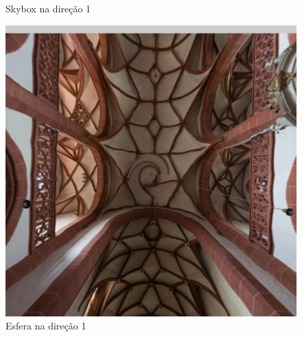 \documentclass[conference]{IEEEtran}
\begin{document}
\begin{figure}[!tbp]
\begin{minipage}[b]{0.3\textwidth}
    \caption{Skybox na direção 1}
    \label{fig:equisphere}
  \end{minipage}
  \hfill
  \begin{minipage}[b]{0.3\textwidth}
    \centering
    \includegraphics[width=1.1\textwidth]{../images/screenshots/Screenshot_2_Sphere}
    \caption{Esfera na direção 1}
    \label{fig:equisphere}
  \end{minipage}
\end{figure}
\end{document}
